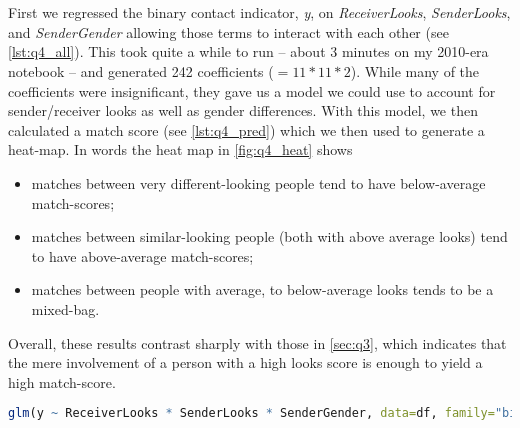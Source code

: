 \section{}
First we regressed the binary contact indicator, \textit{y}, on \textit{ReceiverLooks}, \textit{SenderLooks}, and \textit{SenderGender} allowing those terms to interact with each other (see \vref{lst:q4_all}).  This took quite a while to run -- about 3 minutes on my 2010-era notebook -- and generated 242 coefficients ($=11 * 11 * 2$).  While many of the coefficients were insignificant, they gave us a model we could use to account for sender/receiver looks as well as gender differences.  With this model, we then calculated a match score (see \vref{lst:q4_pred}) which we then used to generate a heat-map.  In words the heat map in \vref{fig:q4_heat} shows
\begin{itemize}
\item matches between very different-looking people tend to have below-average match-scores;
\item matches between similar-looking people (both with above average looks) tend to have above-average match-scores;
\item matches between people with average, to below-average looks tends to be a mixed-bag.
\end{itemize}

Overall, these results contrast sharply with those in \vref{sec:q3}, which indicates that the mere involvement of a person with a high looks score is enough to yield a high match-score.


\begin{lstlisting}[language=R,label=lst:q4_all,caption=Regressing y on all available data.]
glm(y ~ ReceiverLooks * SenderLooks * SenderGender, data=df, family="binomial")
\end{lstlisting}



